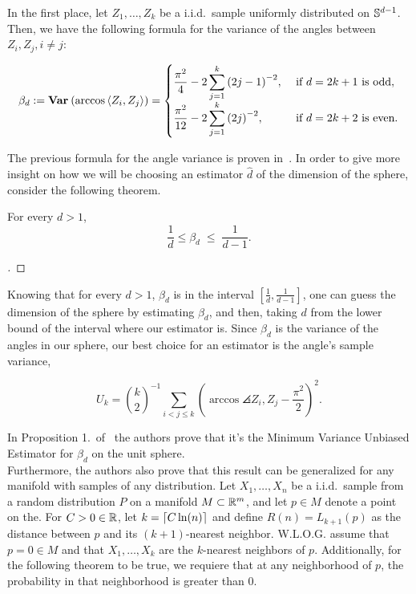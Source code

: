 In the first place, let $Z_1, \ldots, Z_k$ be a i.i.d.\ sample uniformly distributed on $\S^{d-1}$. Then, we have the following formula for the variance of the angles between $Z_i,Z_j, i\neq j$:

\begin{equation}\label{ade:1}\everymath{\displaystyle}
  \beta_d := \Var(\arccos \angles{Z_i,Z_j}) = \begin{cases}
    \frac{\pi^2}{4} - 2 \sum_{j = 1}^{k} {(2j-1)}^{-2}, & \mbox{ if } d = 2k+1 \mbox{ is odd},\\
    \frac{\pi^2}{12}- 2 \sum_{j = 1}^{k} {(2j)}^{-2}, & \mbox{ if } d = 2k+2 \mbox{ is even.}
  \end{cases}
\end{equation}

The previous formula for the angle variance is proven in~\cite{diaz2019local}. In order to give more insight on how we will be choosing an estimator $\widehat{d}$ of the dimension of the sphere, consider the following theorem.

\begin{theorem}\label{ade:T1}
  For every $d > 1$,
  \[ \frac{1}{d} \leq \beta_d \;\leq\; \frac{1}{d-1}. \] 
\end{theorem}
\begin{proof}[]

\end{proof}

\vspace*{1em}

Knowing that for every $d > 1$, $\beta_d$ is in the interval $[\tfrac{1}{d}, \tfrac{1}{d-1}]$, one can guess the dimension of the sphere by estimating $\beta_d$, and then, taking $d$ from the lower bound of the interval where our estimator is. Since $\beta_d$ is the variance of the angles in our sphere, our best choice for an estimator is the angle's sample variance,


\begin{equation}\label{ade:2}
  U_{k} = \binom{k}{2}^{-1} \sum_{i<j\leq k}{\left(
    \arccos\angles{Z_i, Z_j} - \frac{\pi^2}{2} 
    \right)}^{2}.
\end{equation}

In Proposition 1.\ of~\cite{diaz2019local} the authors prove that it's the Minimum Variance Unbiased Estimator for $\beta_d$ on the unit sphere.\\[0.5 em]

Furthermore, the authors also prove that this result can be generalized for any manifold with samples of any distribution. Let $X_1,\ldots, X_n$ be a i.i.d.\ sample from a random distribution $P$ on a manifold $M \subset \R^m$, and let $p \in M$ denote a point on the. For $C>0 \in  \R$, let $k = \ceil{C \ln(n)}$ and define $R(n) = L_{k+1}(p)$ as the distance between $p$ and its $(k+1)$-nearest neighbor. W.L.O.G. assume that $p = 0 \in M$ and that $X_1,\ldots, X_k$ are the $k$-nearest neighbors of $p$. Additionally, for the following theorem to be true, we requiere that at any neighborhood of $p$, the probability in that neighborhood is greater than 0.\\[0.5 em]

